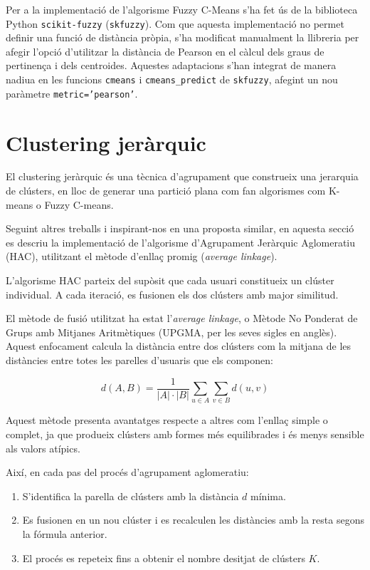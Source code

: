 \documentclass[a4paper,12pt]{report}
\begin{document}
Per a la implementació de l’algorisme Fuzzy C-Means s'ha fet ús de la biblioteca Python \texttt{scikit-fuzzy} (\texttt{skfuzzy}). Com que aquesta implementació no permet definir una funció de distància pròpia, s'ha modificat manualment la llibreria per afegir l'opció d'utilitzar la distància de Pearson en el càlcul dels graus de pertinença i dels centroides. Aquestes adaptacions s'han integrat de manera nadiua en les funcions \texttt{cmeans} i \texttt{cmeans\_predict} de \texttt{skfuzzy}, afegint un nou paràmetre \texttt{metric='pearson'}.

\section{Clustering jeràrquic}

El clustering jeràrquic és una tècnica d’agrupament que construeix una jerarquia de clústers, en lloc de generar una partició plana com fan algorismes com K-means o Fuzzy C-means.

Seguint altres treballs \cite{chalco2019hierarchical} i inspirant-nos en una proposta similar, en aquesta secció es descriu la implementació de l’algorisme d’Agrupament Jeràrquic Aglomeratiu (HAC), utilitzant el mètode d’enllaç promig (\textit{average linkage}).

L’algorisme HAC parteix del supòsit que cada usuari constitueix un clúster individual. A cada iteració, es fusionen els dos clústers amb major similitud.

El mètode de fusió utilitzat ha estat l’\textit{average linkage}, o Mètode No Ponderat de Grups amb Mitjanes Aritmètiques (UPGMA, per les seves sigles en anglès). Aquest enfocament calcula la distància entre dos clústers com la mitjana de les distàncies entre totes les parelles d’usuaris que els componen:

\[
d(A, B) = \frac{1}{|A| \cdot |B|} \sum_{u \in A} \sum_{v \in B} d(u, v)
\]

Aquest mètode presenta avantatges respecte a altres com l’enllaç simple o complet, ja que produeix clústers amb formes més equilibrades i és menys sensible als valors atípics.

Així, en cada pas del procés d’agrupament aglomeratiu:
\begin{enumerate}
    \item S’identifica la parella de clústers amb la distància \(d\) mínima.
    \item Es fusionen en un nou clúster i es recalculen les distàncies amb la resta segons la fórmula anterior.
    \item El procés es repeteix fins a obtenir el nombre desitjat de clústers \(K\).
\end{enumerate}
\end{document}

